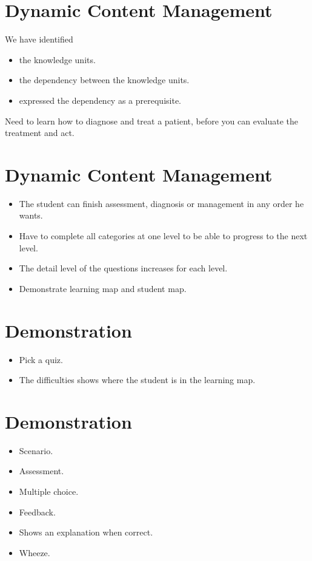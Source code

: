 \documentclass[20pt]{extarticle}
\begin{document}
	\section{Dynamic Content Management}
	We have identified
	\begin{itemize}
		\item  the knowledge units.
		\item the dependency between the knowledge units.
		\item expressed the dependency as a prerequisite.
	\end{itemize}
	Need to learn how to diagnose and treat a patient, before you can evaluate the treatment and act.

	\section{Dynamic Content Management}
	\begin{itemize}
		\item The student can finish assessment, diagnosis or management in any order he wants.
		\item Have to complete all categories at one level to be able to progress to the next level.
		\item The detail level of the questions increases for each level.
		\item Demonstrate learning map and student map. 
	\end{itemize}

	\section{Demonstration}
	\begin{itemize}
		\item Pick a quiz.
		\item The difficulties shows where the student is in the learning map.
	\end{itemize}

	\section{Demonstration}
	\begin{itemize}
		\item Scenario.
		\item Assessment.
		\item Multiple choice.
		\item Feedback.
		\item Shows an explanation when correct.
		\item Wheeze.
	\end{itemize}
\end{document}
